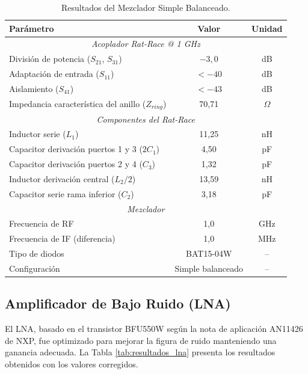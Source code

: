 \begin{table}[htbp]
\centering
\caption{Resultados del Mezclador Simple Balanceado.}
\label{tab:resultados_mixer}
\begin{tabular}{@{}lcc@{}}
\toprule
\textbf{Parámetro} & \textbf{Valor} & \textbf{Unidad} \\
\midrule
\multicolumn{3}{c}{\textit{Acoplador Rat-Race @ 1 GHz}} \\
\midrule
División de potencia ($S_{21}$, $S_{31}$) & $-3,0$ & dB \\
Adaptación de entrada ($S_{11}$) & $< -40$ & dB \\
Aislamiento ($S_{41}$) & $< -43$ & dB \\
Impedancia característica del anillo ($Z_{ring}$) & 70,71 & $\Omega$ \\
\midrule
\multicolumn{3}{c}{\textit{Componentes del Rat-Race}} \\
\midrule
Inductor serie ($L_1$) & 11,25 & nH \\
Capacitor derivación puertos 1 y 3 ($2C_1$) & 4,50 & pF \\
Capacitor derivación puertos 2 y 4 ($C_3$) & 1,32 & pF \\
Inductor derivación central ($L_2/2$) & 13,59 & nH \\
Capacitor serie rama inferior ($C_2$) & 3,18 & pF \\
\midrule
\multicolumn{3}{c}{\textit{Mezclador}} \\
\midrule
Frecuencia de RF & 1,0 & GHz \\
Frecuencia de IF (diferencia) & 1,0 & MHz \\
Tipo de diodos & BAT15-04W & -- \\
Configuración & Simple balanceado & -- \\
\bottomrule
\end{tabular}
\end{table}

\subsection{Amplificador de Bajo Ruido (LNA)}

El LNA, basado en el transistor BFU550W según la nota de aplicación AN11426 de NXP, fue optimizado para mejorar la figura de ruido manteniendo una ganancia adecuada. La Tabla \ref{tab:resultados_lna} presenta los resultados obtenidos con los valores corregidos.


